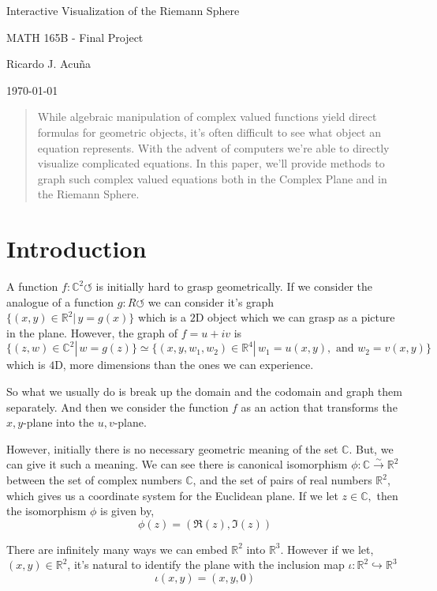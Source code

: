 \documentclass{article}
\newcommand\R{\mathbb{R}}
\newcommand\C{\mathbb{C}}
\begin{document}
\begin{center}
  Interactive Visualization of the Riemann Sphere

  MATH 165B - Final Project

  Ricardo J. Acuña

  \today{}
\end{center}\vspace{1.618em}
\begin{abstract}
  While algebraic manipulation of complex valued functions yield
  direct formulas for geometric objects, it's often difficult to see
  what object an equation represents. With
  the advent of computers we're able to directly visualize complicated
  equations. In this paper, we'll provide methods to graph such
  complex valued equations both in the Complex Plane and in the
  Riemann Sphere.
  \end{abstract}

\section{Introduction}

A function $f: \C^2\circlearrowleft$ is initially hard to grasp
geometrically. If we
consider the analogue of a function $g:R\circlearrowleft$ we can
consider it's graph $\{(x,y)\in \R^2|\, y = g(x)\}$ which is a $2$D
object which we can grasp as a picture in the plane. However, the
graph of $f = u+iv$ is $\{(z,w)\in \C^2|\, w = g(z)\} \simeq
\{(x,y,w_1,w_2)\in \R^4|\, w_1 = u(x,y),\text{ and } w_2 = v(x,y)\}$
which is $4$D, more dimensions than the ones we can experience.

So what we usually do is break up the domain and the codomain and
graph them separately. And then we consider the function $f$ as an
action that transforms the $x,y$-plane into the $u,v$-plane.

However, initially there is no necessary geometric meaning of the set
$\C$. But, we can give it such a meaning. We can see there is canonical isomorphism $\phi:\C \xrightarrow{\sim} \R^2$ between the set of complex
numbers $\C$, and the set of pairs of real numbers $\R^2$, which gives
us a coordinate system for the Euclidean plane. If we let
$z\in \C,$ then the isomorphism $\phi$ is given by,
\[\phi(z) = (\Re(z),\Im(z))\]

There are infinitely many ways we can embed $\R^2$ into
$\R^3$. However if we let,
$(x,y) \in \R^2$, it's natural to identify the plane with the
inclusion map $\iota:\R^2\hookrightarrow \R^3$
\[\iota(x,y) = (x,y,0)\]
\end{document}
